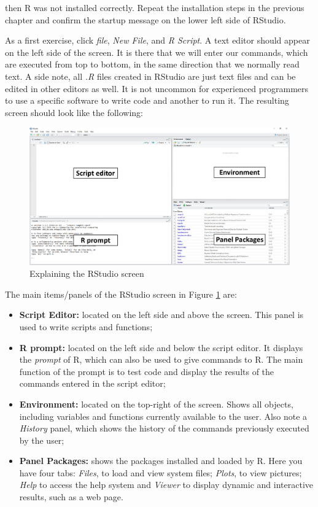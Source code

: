 \documentclass[11pt,]{book}
\begin{document}
then R was not installed correctly. Repeat the installation steps in the
previous chapter and confirm the startup message on the lower left side
of RStudio.

As a first exercise, click \emph{file}, \emph{New File}, and \emph{R
Script}. A text editor should appear on the left side of the screen. It
is there that we will enter our commands, which are executed from top to
bottom, in the same direction that we normally read text. A side note,
all \emph{.R} files created in RStudio are just text files and can be
edited in other editors as well. It is not uncommon for experienced
programmers to use a specific software to write code and another to run
it. The resulting screen should look like the following:

\begin{figure}[!htbp]

{\centering \includegraphics[width=1\linewidth]{figs/RStudio2} 

}

\caption{Explaining the RStudio screen}\label{fig:RStudio2}
\end{figure}

The main items/panels of the RStudio screen in Figure \ref{fig:RStudio2}
are:

\begin{itemize}
\item
  \textbf{Script Editor:} located on the left side and above the screen.
  This panel is used to write scripts and functions;
\item
  \textbf{R prompt:} located on the left side and below the script
  editor. It displays the \emph{prompt} of R, which can also be used to
  give commands to R. The main function of the prompt is to test code
  and display the results of the commands entered in the script editor;
\item
  \textbf{Environment:} located on the top-right of the screen. Shows
  all objects, including variables and functions currently available to
  the user. Also note a \emph{History} panel, which shows the history of
  the commands previously executed by the user; 
\item
  \textbf{Panel Packages:} shows the packages installed and loaded by R.
  Here you have four tabs: \emph{Files}, to load and view system files;
  \emph{Plots}, to view pictures; \emph{Help} to access the help system
  and \emph{Viewer} to display dynamic and interactive results, such as
  a web page. 
\end{itemize}
\end{document}
